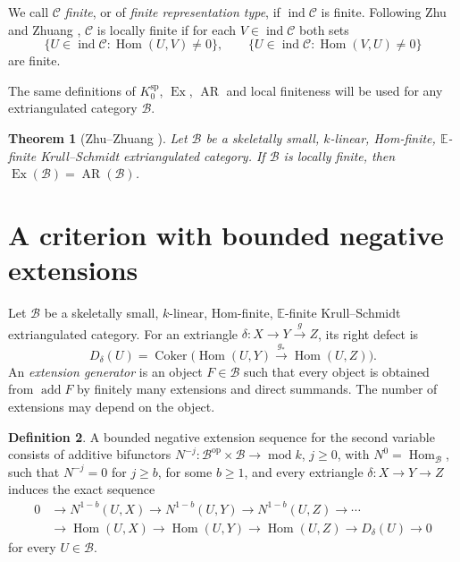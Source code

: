 \documentclass[pdflatex,sn-mathphys-num]{sn-jnl}
\numberwithin{equation}{section}
\newtheorem{theorem}{Theorem}[section]
\theoremstyle{definition}
\newtheorem{definition}[theorem]{Definition}
\theoremstyle{remark}\newtheorem{remark}[theorem]{Remark}
\newcommand{\C}{\mathcal C}
\newcommand{\E}{\mathbb E}
\newcommand{\Hom}{\operatorname{Hom}}
\newcommand{\ind}{\operatorname{ind}}
\newcommand{\add}{\operatorname{add}}
\newcommand{\modu}{\operatorname{mod}}
\newcommand{\Ex}{\operatorname{Ex}}
\newcommand{\AR}{\operatorname{AR}}
\newcommand{\coker}{\operatorname{Coker}}
\newcommand{\ksp}{K_0^{\mathrm{sp}}}
\begin{document}
We call $\C$ \emph{finite}, or of \emph{finite representation type},
if $\ind\C$ is finite. Following Zhu and Zhuang
\cite[Definition 3.1]{ZZ}, $\C$ is locally finite if for each
$V\in\ind\C$ both sets
\[
 \{U\in\ind\C:\Hom(U,V)\ne0\},\qquad
 \{U\in\ind\C:\Hom(V,U)\ne0\}
\]
are finite.

The same definitions of $\ksp$, $\Ex$, $\AR$ and local finiteness
will be used for any extriangulated category $\mathcal B$.

\begin{theorem}[{Zhu--Zhuang \cite[Theorem 4.4]{ZZ}}]\label{thm:ZZ}
Let $\mathcal B$ be a skeletally small, $k$-linear, Hom-finite,
$\E$-finite Krull--Schmidt extriangulated category. If $\mathcal B$ is
locally finite, then $\Ex(\mathcal B)=\AR(\mathcal B)$.
\end{theorem}

\section{A criterion with bounded negative extensions}\label{sec:general}
Let $\mathcal B$ be a skeletally small, $k$-linear, Hom-finite,
$\E$-finite Krull--Schmidt extriangulated category. For an extriangle
$\delta:X\to Y\xrightarrow g Z$, its right defect is
\[
 D_\delta(U)=\coker\bigl(\Hom(U,Y)\xrightarrow{g_*}\Hom(U,Z)\bigr).
\]
An \emph{extension generator} is an object $F\in\mathcal B$ such that every object
is obtained from $\add F$ by finitely many extensions and direct
summands. The number of extensions may depend on the object.

\begin{definition}\label{def:negative}
A bounded negative extension sequence for the second variable consists
of additive bifunctors
$N^{-j}:\mathcal B^{\mathrm{op}}\times\mathcal B\to\modu k$, $j\geq0$,
with $N^0=\Hom_{\mathcal B}$, such that $N^{-j}=0$ for $j\geq b$, for some $b\geq1$,
and every extriangle $\delta:X\to Y\to Z$ induces the exact sequence
\begin{equation}\label{eq:negativeexact}
\begin{aligned}
0&\longrightarrow N^{1-b}(U,X)\longrightarrow N^{1-b}(U,Y)
 \longrightarrow N^{1-b}(U,Z)\longrightarrow\cdots\\
 &\longrightarrow\Hom(U,X)\longrightarrow\Hom(U,Y)
 \longrightarrow\Hom(U,Z)\longrightarrow D_\delta(U)\longrightarrow0
\end{aligned}
\end{equation}
for every $U\in\mathcal B$.
\end{definition}
\end{document}
